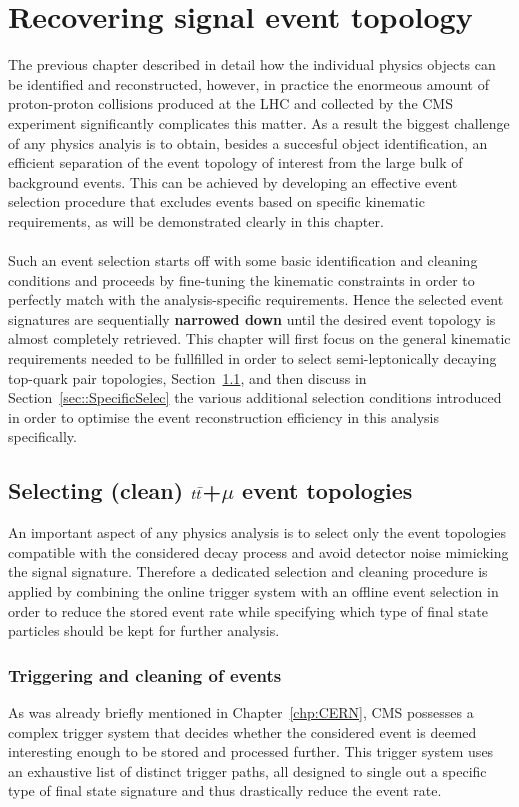 \chapter{Recovering signal event topology} \label{chp:labelTitle}

The previous chapter described in detail how the individual physics objects can be identified and reconstructed, however, in practice the enormeous amount of proton-proton collisions produced at the LHC and collected by the CMS experiment significantly complicates this matter.
As a result the biggest challenge of any physics analyis is to obtain, besides a succesful object identification, an efficient separation of the event topology of interest from the large bulk of background events.
This can be achieved by developing an effective event selection procedure that excludes events based on specific kinematic requirements, as will be demonstrated clearly in this chapter.
\\
\\
Such an event selection starts off with some basic identification and cleaning conditions and proceeds by fine-tuning the kinematic constraints in order to perfectly match with the analysis-specific requirements. Hence the selected event signatures are sequentially \textbf{narrowed down} until the desired event topology is almost completely retrieved. This chapter will first focus on the general kinematic requirements needed to be fullfilled in order to select semi-leptonically decaying top-quark pair topologies, Section~\ref{sec::MainSelec}, and then discuss in Section~\ref{sec::SpecificSelec} the various additional selection conditions introduced in order to optimise the event reconstruction efficiency in this analysis specifically.

\section{Selecting (clean) $t\bar{t}$+$\mu$ event topologies}\label{sec::MainSelec}
An important aspect of any physics analysis is to select only the event topologies compatible with the considered decay process and avoid detector noise mimicking the signal signature. 
Therefore a dedicated selection and cleaning procedure is applied by combining the online trigger system with an offline event selection in order to reduce the stored event rate while specifying which type of final state particles should be kept for further analysis.

\subsection{Triggering and cleaning of events}\label{subsec::Trigger}
As was already briefly mentioned in Chapter~\ref{chp:CERN}, CMS possesses a complex trigger system that decides whether the considered event is deemed interesting enough to be stored and processed further.
This trigger system uses an exhaustive list of distinct trigger paths, all designed to single out a specific type of final state signature and thus drastically reduce the event rate.
\\


